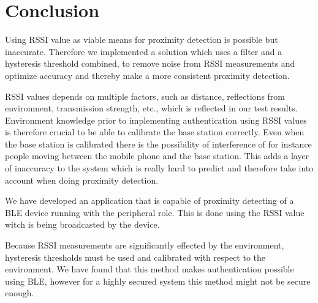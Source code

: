 \chapter{Conclusion}
Using RSSI value as viable means for proximity detection is possible but inaccurate. Therefore we implemented a solution which uses a filter and a hysteresis threshold combined, to remove noise from RSSI measurements and optimize accuracy and thereby make a more consistent proximity detection.

RSSI values depends on multiple factors, such as distance, reflections from environment, transmission strength, etc., which is reflected in our test results.
Environment knowledge prior to implementing authentication using RSSI values is therefore crucial to be able to calibrate the base station correctly. 
Even when the base station is calibrated there is the possibility of interference of for instance people moving between the mobile phone and the base station. 
This adds a layer of inaccuracy to the system which is really hard to predict and therefore take into account when doing proximity detection.

We have developed an application that is capable of proximity detecting of a BLE device running with the peripheral role. This is done using the RSSI value witch is being broadcasted by the device.

Because RSSI measurements are significantly effected by the environment, hysteresis thresholds must be used and calibrated with respect to the environment.
We have found that this method makes authentication possible using BLE, however for a highly secured system this method might not be secure enough.

%

